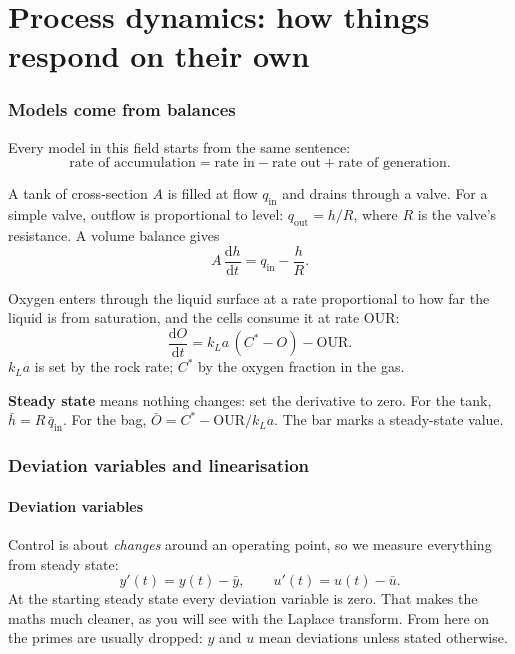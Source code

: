 \documentclass[11pt,a4paper]{article}
\newcommand{\dd}{\mathrm{d}}
\begin{document}
\part{Process dynamics: how things respond on their own}

\section{Models come from balances}
Every model in this field starts from the same sentence:
\begin{equation}
  \text{rate of accumulation} = \text{rate in} - \text{rate out} + \text{rate of generation}.
\end{equation}

\begin{example}[title={Example 1: a tank draining through a valve}]
A tank of cross-section $A$ is filled at flow $q_{\mathrm{in}}$ and drains through a valve. For a simple
valve, outflow is proportional to level: $q_{\mathrm{out}} = h/R$, where $R$ is the valve's resistance.
A volume balance gives
\[
  A\,\frac{\dd h}{\dd t} = q_{\mathrm{in}} - \frac{h}{R}.
\]
\end{example}

\begin{example}[title={Example 2: dissolved oxygen in the rocking bag}]
Oxygen enters through the liquid surface at a rate proportional to how far the liquid is from
saturation, and the cells consume it at rate OUR:
\[
  \frac{\dd O}{\dd t} = k_La\,(C^* - O) - \mathrm{OUR}.
\]
$k_La$ is set by the rock rate; $C^*$ by the oxygen fraction in the gas.
\end{example}

\textbf{Steady state} means nothing changes: set the derivative to zero. For the tank,
$\bar h = R\,\bar q_{\mathrm{in}}$. For the bag, $\bar O = C^* - \mathrm{OUR}/k_La$. The bar marks a
steady-state value.

\section{Deviation variables and linearisation}

\subsection{Deviation variables}
Control is about \emph{changes} around an operating point, so we measure everything from steady state:
\[
  y'(t) = y(t) - \bar y, \qquad u'(t) = u(t) - \bar u .
\]
At the starting steady state every deviation variable is zero. That makes the maths much cleaner, as
you will see with the Laplace transform. From here on the primes are usually dropped: $y$ and $u$ mean
deviations unless stated otherwise.
\end{document}
